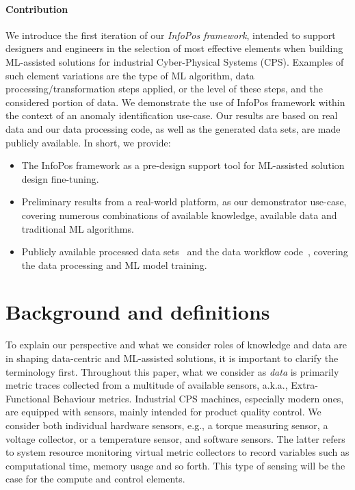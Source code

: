 \paragraph*{Contribution}
We introduce the first iteration of our \emph{InfoPos framework}, intended to support designers and engineers in the selection of most effective elements when building ML-assisted solutions for industrial Cyber-Physical Systems (CPS). Examples of such element variations are the type of ML algorithm, data processing/transformation steps applied, or the  level of these steps, and the considered portion of data. We demonstrate the use of InfoPos framework within the context of an anomaly identification use-case. Our results are based on real data and our data processing code, as well as the generated data sets, are made publicly available. In short, we provide:
%
\begin{itemize}
	\item The InfoPos framework as a pre-design support tool for ML-assisted solution design fine-tuning.
	\item Preliminary results from a real-world platform, as our demonstrator use-case, covering numerous combinations of available knowledge, available data and traditional ML algorithms.
	\item Publicly available processed data sets~\cite{Odyurt:2025:DATASET} and the data workflow code~\cite{Odyurt:2025:CODE}, covering the data processing and ML model training.
\end{itemize}

\section{Background and definitions}
\label{sec:background}
To explain our perspective and what we consider roles of knowledge and data are in shaping data-centric and ML-assisted solutions, it is important to clarify the terminology first. Throughout this paper, what we consider as \emph{data} is primarily metric traces collected from a multitude of available sensors, a.k.a., Extra-Functional Behaviour metrics. Industrial CPS machines, especially modern ones, are equipped with sensors, mainly intended for product quality control. We consider both individual hardware sensors, e.g., a torque measuring sensor, a voltage collector, or a temperature sensor, and software sensors. The latter refers to system resource monitoring virtual metric collectors to record variables such as computational time, memory usage and so forth. This type of sensing will be the case for the compute and control elements.

